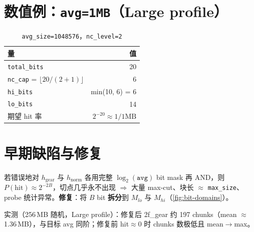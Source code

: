 \section{数值例：\texttt{avg=1MB}（Large profile）}

\begin{table}[htbp]
\centering
\caption{\texttt{avg\_size=1048576}，\texttt{nc\_level=2}}
\small
\begin{tabular}{@{}lr@{}}
\toprule
量 & 值 \\
\midrule
\texttt{total\_bits} & 20 \\
\texttt{nc\_cap} = $\lfloor 20/(2+1)\rfloor$ & 6 \\
\texttt{hi\_bits} & min(10, 6) = 6 \\
\texttt{lo\_bits} & 14 \\
期望 hit 率 & $2^{-20} \approx 1/1\text{MB}$ \\
\bottomrule
\end{tabular}
\end{table}

\section{早期缺陷与修复}

\begin{v6box}
若错误地对 $h_{\mathrm{gear}}$ 与 $h_{\mathrm{norm}}$ 各用完整 $\log_2(\texttt{avg})$ bit mask 再 AND，则
$P(\text{hit}) \approx 2^{-2B}$，切点几乎永不出现 $\Rightarrow$ 大量 max-cut、块长 $\approx$ \texttt{max\_size}、probe 统计异常。\textbf{修复}：将 $B$ bit \textbf{拆分}到 $M_{lo}$ 与 $M_{hi}$（\cref{fig:bit-domains}）。
\end{v6box}

实测（256\,MB 随机，Large profile）：修复后 2f\_gear 约 197 chunks（mean $\approx$1.36\,MB），与目标 avg 同阶；修复前 hit$\approx 0$ 时 chunks 数极低且 mean$\rightarrow$max。
